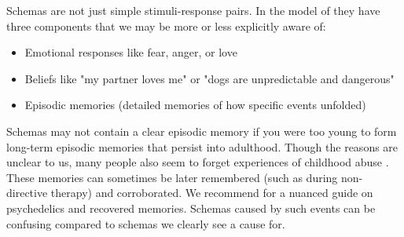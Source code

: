 \documentclass[12pt,letterpaper]{book}
\begin{document}
Schemas are not just simple stimuli-response pairs. In the model of \textcite{laneReconsolidation} they have three components that we may be more or less explicitly aware of:
\begin{itemize}
	\item Emotional responses like fear, anger, or love
	\item Beliefs like "my partner loves me" or "dogs are unpredictable and dangerous"
	\item Episodic memories (detailed memories of how specific events unfolded)
\end{itemize}
Schemas may not contain a clear episodic memory if you were too young to form long-term episodic memories that persist into adulthood. Though the reasons are unclear to us, many people also seem to forget experiences of childhood abuse . These memories can sometimes be later remembered (such as during non-directive therapy) and corroborated. We recommend \textcite{psychedelicrecoveredmemory} for a nuanced guide on psychedelics and recovered memories. Schemas caused by such events can be confusing compared to schemas we clearly see a cause for.
\end{document}
